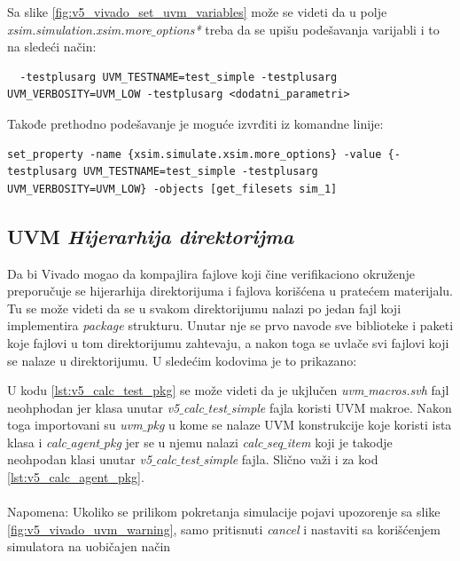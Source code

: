 Sa slike \ref{fig:v5_vivado_set_uvm_variables} može se videti da u polje \emph{xsim.simulation.xsim.more\(\_\)options*} treba da
se upišu podešavanja varijabli i to na sledeći način:
\begin{lstlisting}
  -testplusarg UVM_TESTNAME=test_simple -testplusarg UVM_VERBOSITY=UVM_LOW -testplusarg <dodatni_parametri>  
\end{lstlisting}

Takođe prethodno podešavanje je moguće izvrđiti iz komandne linije:
\begin{lstlisting}
set_property -name {xsim.simulate.xsim.more_options} -value {-testplusarg UVM_TESTNAME=test_simple -testplusarg UVM_VERBOSITY=UVM_LOW} -objects [get_filesets sim_1]
\end{lstlisting}

\subsection{UVM \emph{Hijerarhija direktorijma}}

Da bi Vivado mogao da kompajlira fajlove koji čine verifikaciono okruženje preporučuje se 
hijerarhija direktorijuma i fajlova korišćena u pratećem materijalu. Tu se može videti da
se u svakom direktorijumu nalazi po jedan fajl koji implementira \emph{package} strukturu.
Unutar nje se prvo navode sve biblioteke i paketi koje fajlovi u tom direktorijumu zahtevaju,
a nakon toga se uvlače svi fajlovi koji se nalaze u direktorijumu. U sledećim kodovima
je to prikazano:




U kodu \ref{lst:v5_calc_test_pkg} se može videti da je ukjlučen \emph{uvm\(\_\)macros.svh} fajl neohphodan
jer klasa unutar \emph{v5\(\_\)calc\(\_\)test\(\_\)simple} fajla koristi UVM makroe.
Nakon toga importovani su \emph{uvm\(\_\)pkg} u kome se nalaze UVM konstrukcije koje
koristi ista klasa i  \emph{calc\(\_\)agent\(\_\)pkg} jer se u njemu nalazi \emph{calc\(\_\)seq\(\_\)item} koji je
takodje neohpodan klasi unutar \emph{v5\(\_\)calc\(\_\)test\(\_\)simple} fajla. Slično važi i za kod \ref{lst:v5_calc_agent_pkg}.
\\
\\
Napomena: Ukoliko se prilikom pokretanja simulacije pojavi upozorenje sa slike \ref{fig:v5_vivado_uvm_warning}, samo pritisnuti \emph{cancel}
i nastaviti sa korišćenjem simulatora na uobičajen način

